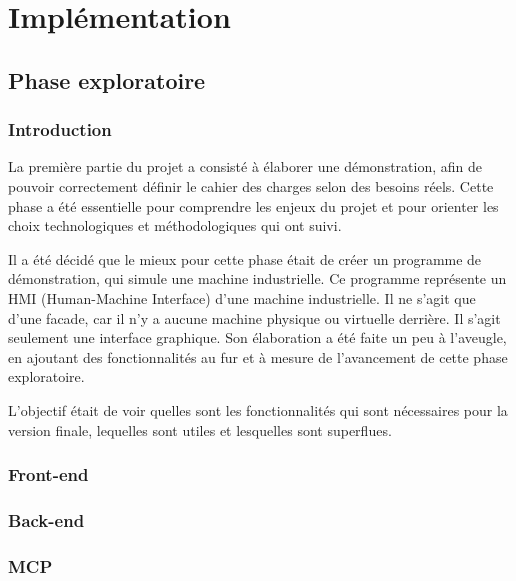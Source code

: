 \chapter{Implémentation}

\section{Phase exploratoire}

\subsection{Introduction}
La première partie du projet a consisté à élaborer une démonstration, afin de pouvoir correctement définir le cahier des charges selon des besoins réels. Cette phase a été essentielle pour comprendre les enjeux du projet et pour orienter les choix technologiques et méthodologiques qui ont suivi.

Il a été décidé que le mieux pour cette phase était de créer un programme de démonstration, qui simule une machine industrielle. Ce programme représente un HMI (Human-Machine Interface) d'une machine industrielle. Il ne s'agit que d'une facade, car il n'y a aucune machine physique ou virtuelle derrière. Il s'agit seulement une interface graphique. Son élaboration a été faite un peu à l'aveugle, en ajoutant des fonctionnalités au fur et à mesure de l'avancement de cette phase exploratoire.

L'objectif était de voir quelles sont les fonctionnalités qui sont nécessaires pour la version finale, lequelles sont utiles et lesquelles sont superflues.

\subsection{Front-end}

\subsection{Back-end}

\subsection{MCP}

